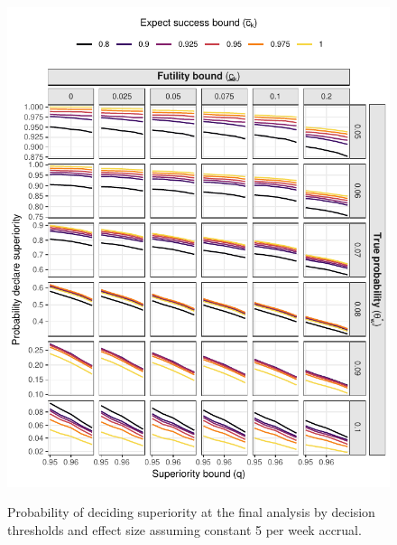 \documentclass{article}
\begin{document}
\begin{figure}[!ht]
	\caption{Probability of deciding superiority at the final analysis by decision thresholds and effect size assuming constant 5 per week accrual.}
	\includegraphics{superiority_5.pdf}
	\label{fig:superiority_5}
\end{figure}
\end{document}
